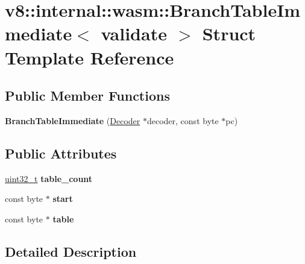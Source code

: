 \hypertarget{structv8_1_1internal_1_1wasm_1_1BranchTableImmediate}{}\section{v8\+:\+:internal\+:\+:wasm\+:\+:Branch\+Table\+Immediate$<$ validate $>$ Struct Template Reference}
\label{structv8_1_1internal_1_1wasm_1_1BranchTableImmediate}
\subsection*{Public Member Functions}
\begin{DoxyCompactItemize}
\item 
\mbox{\label{structv8_1_1internal_1_1wasm_1_1BranchTableImmediate_accf3bf821ba8bacfbf4647ef9104e6d3}} 
{\bfseries Branch\+Table\+Immediate} (\mbox{\hyperlink{classv8_1_1internal_1_1wasm_1_1Decoder}{Decoder}} $\ast$decoder, const byte $\ast$pc)
\end{DoxyCompactItemize}
\subsection*{Public Attributes}
\begin{DoxyCompactItemize}
\item 
\mbox{\label{structv8_1_1internal_1_1wasm_1_1BranchTableImmediate_a13ac8736f1310bf2bdbdda6669289fc3}} 
\mbox{\hyperlink{classuint32__t}{uint32\+\_\+t}} {\bfseries table\+\_\+count}
\item 
\mbox{\label{structv8_1_1internal_1_1wasm_1_1BranchTableImmediate_a599b525257bf12b45aeef3a541b44147}} 
const byte $\ast$ {\bfseries start}
\item 
\mbox{\label{structv8_1_1internal_1_1wasm_1_1BranchTableImmediate_a8848825c96f1e66de265db13925e5609}} 
const byte $\ast$ {\bfseries table}
\end{DoxyCompactItemize}


\subsection{Detailed Description}
